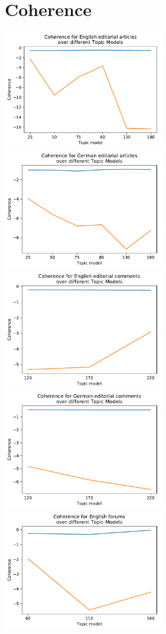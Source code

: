 \section{Coherence}

\includegraphics[width=7cm]{gfx/Eval_IC/English_Editorial_Coherence.pdf}
\includegraphics[width=7cm]{gfx/Eval_IC/German_Editorial_Coherence.pdf}
\includegraphics[width=7cm]{gfx/Eval_IC/Eng_comments_Coherence.pdf}
\includegraphics[width=7cm]{gfx/Eval_IC/German_comments_Coherence.pdf}
\includegraphics[width=7cm]{gfx/Eval_IC/English forums_Coherence.pdf}

